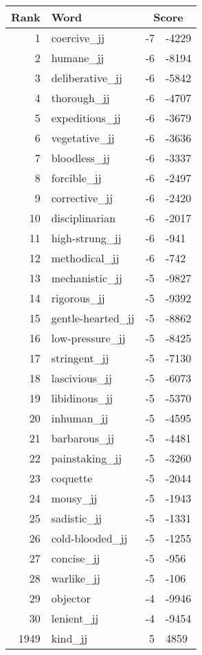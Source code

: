 \begin{longtable}[!htbp]{| rlr@{.}l |}
    \hline
    \textbf{Rank} & \textbf{Word} & \multicolumn{2}{c|}{\textbf{Score}} \\
    \hline
    \endhead
    1 & coercive\_jj & -7 & -4229 \\
    2 & humane\_jj & -6 & -8194 \\
    3 & deliberative\_jj & -6 & -5842 \\
    4 & thorough\_jj & -6 & -4707 \\
    5 & expeditious\_jj & -6 & -3679 \\
    6 & vegetative\_jj & -6 & -3636 \\
    7 & bloodless\_jj & -6 & -3337 \\
    8 & forcible\_jj & -6 & -2497 \\
    9 & corrective\_jj & -6 & -2420 \\
    10 & disciplinarian & -6 & -2017 \\
    11 & high-strung\_jj & -6 & -941 \\
    12 & methodical\_jj & -6 & -742 \\
    13 & mechanistic\_jj & -5 & -9827 \\
    14 & rigorous\_jj & -5 & -9392 \\
    15 & gentle-hearted\_jj & -5 & -8862 \\
    16 & low-pressure\_jj & -5 & -8425 \\
    17 & stringent\_jj & -5 & -7130 \\
    18 & lascivious\_jj & -5 & -6073 \\
    19 & libidinous\_jj & -5 & -5370 \\
    20 & inhuman\_jj & -5 & -4595 \\
    21 & barbarous\_jj & -5 & -4481 \\
    22 & painstaking\_jj & -5 & -3260 \\
    23 & coquette & -5 & -2044 \\
    24 & mousy\_jj & -5 & -1943 \\
    25 & sadistic\_jj & -5 & -1331 \\
    26 & cold-blooded\_jj & -5 & -1255 \\
    27 & concise\_jj & -5 & -956 \\
    28 & warlike\_jj & -5 & -106 \\
    29 & objector & -4 & -9946 \\
    30 & lenient\_jj & -4 & -9454 \\
    1949 & kind\_jj & 5 & 4859 \\

\end{longtable}
